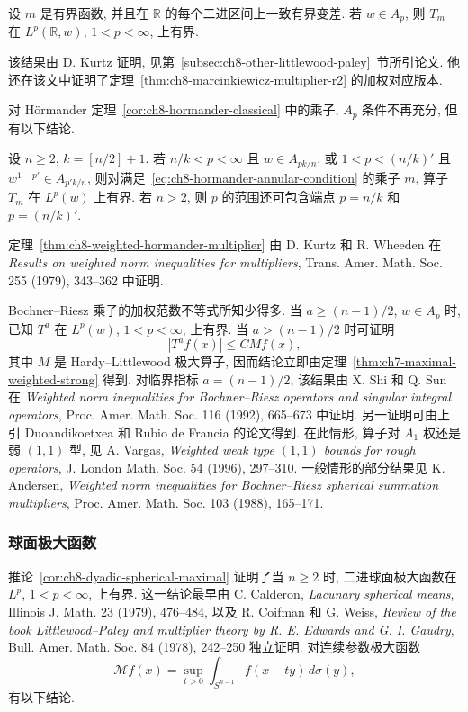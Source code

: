 \begin{Theorem}
\label{thm:ch8-weighted-marcinkiewicz}
设 $m$ 是有界函数, 并且在 $\mathbb R$ 的每个二进区间上一致有界变差. 若 $w\in A_p$, 则 $T_m$ 在 $L^p(\mathbb R,w)$, $1<p<\infty$, 上有界.
\end{Theorem}

该结果由 D. Kurtz 证明, 见第~\ref{subsec:ch8-other-littlewood-paley}~节所引论文. 他还在该文中证明了定理~\ref{thm:ch8-marcinkiewicz-multiplier-r2} 的加权对应版本.

对 Hörmander 定理~\ref{cor:ch8-hormander-classical} 中的乘子, $A_p$ 条件不再充分, 但有以下结论.

\begin{Theorem}
\label{thm:ch8-weighted-hormander-multiplier}
设 $n\ge2$, $k=[n/2]+1$. 若 $n/k<p<\infty$ 且 $w\in A_{pk/n}$, 或 $1<p<(n/k)'$ 且 $w^{1-p'}\in A_{p'k/n}$, 则对满足~\eqref{eq:ch8-hormander-annular-condition} 的乘子 $m$, 算子 $T_m$ 在 $L^p(w)$ 上有界. 若 $n>2$, 则 $p$ 的范围还可包含端点 $p=n/k$ 和 $p=(n/k)'$.
\end{Theorem}

定理~\ref{thm:ch8-weighted-hormander-multiplier} 由 D. Kurtz 和 R. Wheeden 在 \textit{Results on weighted norm inequalities for multipliers}, Trans. Amer. Math. Soc. 255 (1979), 343--362 中证明.

Bochner--Riesz 乘子的加权范数不等式所知少得多. 当 $a\ge(n-1)/2$, $w\in A_p$ 时, 已知 $T^a$ 在 $L^p(w)$, $1<p<\infty$, 上有界. 当 $a>(n-1)/2$ 时可证明
\[
 |T^af(x)|\le CMf(x),
\]
其中 $M$ 是 Hardy--Littlewood 极大算子, 因而结论立即由定理~\ref{thm:ch7-maximal-weighted-strong} 得到. 对临界指标 $a=(n-1)/2$, 该结果由 X. Shi 和 Q. Sun 在 \textit{Weighted norm inequalities for Bochner--Riesz operators and singular integral operators}, Proc. Amer. Math. Soc. 116 (1992), 665--673 中证明. 另一证明可由上引 Duoandikoetxea 和 Rubio de Francia 的论文得到. 在此情形, 算子对 $A_1$ 权还是弱 $(1,1)$ 型, 见 A. Vargas, \textit{Weighted weak type $(1,1)$ bounds for rough operators}, J. London Math. Soc. 54 (1996), 297--310. 一般情形的部分结果见 K. Andersen, \textit{Weighted norm inequalities for Bochner--Riesz spherical summation multipliers}, Proc. Amer. Math. Soc. 103 (1988), 165--171.

\hypertarget{chapter-08-page-203}{}
\subsubsection{球面极大函数}
\label{subsec:ch8-spherical-maximal}

推论~\ref{cor:ch8-dyadic-spherical-maximal} 证明了当 $n\ge2$ 时, 二进球面极大函数在 $L^p$, $1<p<\infty$, 上有界. 这一结论最早由 C. Calderon, \textit{Lacunary spherical means}, Illinois J. Math. 23 (1979), 476--484, 以及 R. Coifman 和 G. Weiss, \textit{Review of the book Littlewood--Paley and multiplier theory by R. E. Edwards and G. I. Gaudry}, Bull. Amer. Math. Soc. 84 (1978), 242--250 独立证明. 对连续参数极大函数
\[
 \mathcal Mf(x)=\sup_{t>0}\int_{S^{n-1}}f(x-ty)\,d\sigma(y),
\]
有以下结论.

